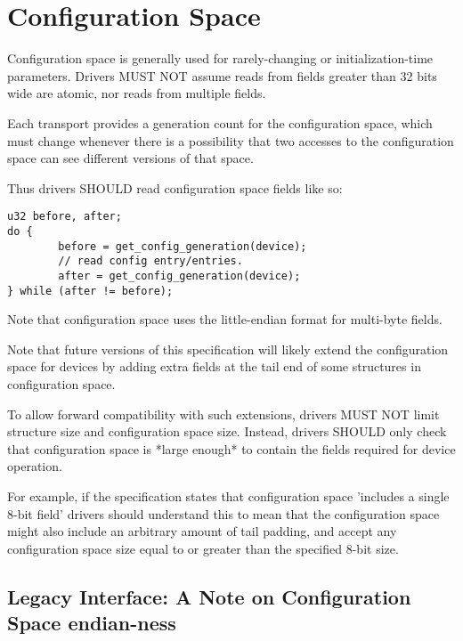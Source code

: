 \section{Configuration Space}\label{sec:Basic Facilities of a Virtio Device / Configuration Space}

Configuration space is generally used for rarely-changing or
initialization-time parameters.  Drivers MUST NOT assume reads from
fields greater than 32 bits wide are atomic, nor reads from
multiple fields.

Each transport provides a generation count for the configuration
space, which must change whenever there is a possibility that two
accesses to the configuration space can see different versions of that
space.

Thus drivers SHOULD read configuration space fields like so:

\begin{lstlisting}
u32 before, after;
do {
        before = get_config_generation(device);
        // read config entry/entries.
        after = get_config_generation(device);
} while (after != before);
\end{lstlisting}

Note that configuration space uses the little-endian format
for multi-byte fields.

Note that future versions of this specification will likely
extend the configuration space for devices by adding extra fields
at the tail end of some structures in configuration space.

To allow forward compatibility with such extensions, drivers MUST
NOT limit structure size and configuration space size.  Instead,
drivers SHOULD only check that configuration space is *large enough* to
contain the fields required for device operation.

For example, if the specification states that configuration
space 'includes a single 8-bit field' drivers should understand this to mean that
the configuration space might also include an arbitrary amount of
tail padding, and accept any configuration space size equal to or
greater than the specified 8-bit size.

\subsection{Legacy Interface: A Note on Configuration Space endian-ness}\label{sec:Basic Facilities of a Virtio Device / Configuration Space / Legacy Interface: A Note on Configuration Space endian-ness}

